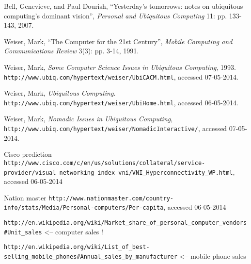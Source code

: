 \begin{thebibliography}{9}

        Bell, Genevieve, and Paul Dourish,
        ``Yesterday's tomorrows: notes on ubiquitous computing's dominant vision'',
        \emph{Personal and Ubiquitous Computing} 11: pp. 133-143,
        2007.
        
        Weiser, Mark,
        ``The Computer for the 21st Century'',
        \emph{Mobile Computing and Communications Review} 3(3): pp. 3-14,
        1991.
		
		Weiser, Mark,
		\emph{Some Computer Science Issues in Ubiquitous Computing},
		1993.
		\verb+http://www.ubiq.com/hypertext/weiser/UbiCACM.html+, accessed 07-05-2014.
        
        Weiser, Mark,
        \emph{Ubiquitous Computing}.
        \verb+http://www.ubiq.com/hypertext/weiser/UbiHome.html+, accessed 06-05-2014.
        
		Weiser, Mark,
		\emph{Nomadic Issues in Ubiquitous Computing},
		\verb+http://www.ubiq.com/hypertext/weiser/NomadicInteractive/+, accessed 07-05-2014.
		
        Cisco prediction
        \verb+http://www.cisco.com/c/en/us/solutions/collateral/service-provider/visual-networking-index-vni/VNI_Hyperconnectivity_WP.html+, accessed 06-05-2014
        
        Nation master
        \verb+http://www.nationmaster.com/country-info/stats/Media/Personal-computers/Per-capita+, accessed 06-05-2014
        
    \verb+http://en.wikipedia.org/wiki/Market_share_of_personal_computer_vendors#Unit_sales+ <-- computer sales ! 

    \verb+http://en.wikipedia.org/wiki/List_of_best-selling_mobile_phones#Annual_sales_by_manufacturer+ <-- mobile phone sales
 
\end{thebibliography}